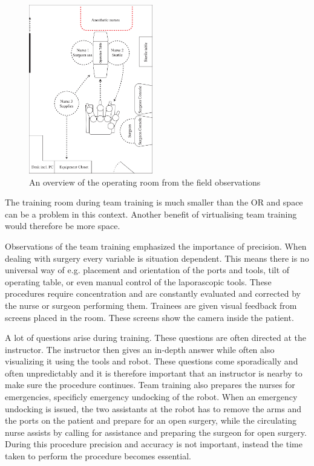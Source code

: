 \documentclass[conference]{IEEEtran}
\begin{document}
\begin{figure}[H]
 \centering
 \includegraphics[width=0.48\textwidth]{Figures/overview.pdf}
 \caption{An overview of the operating room from the field observations}
 \label{fig:overview}
 \end{figure}
 
The training room during team training is much smaller than the OR and space can be a problem in this context. Another benefit of virtualising team training would therefore be more space.

Observations of the team training emphasized the importance of precision. When dealing with surgery every variable is situation dependent. This means there is no universal way of e.g. placement and orientation of the ports and tools, tilt of operating table, or even manual control of the laporascopic tools. These procedures require concentration and are constantly evaluated and corrected by the nurse or surgeon performing them. Trainees are given visual feedback from screens placed in the room. These screens show the camera inside the patient. 


A lot of questions arise during training. These questions are often directed at the instructor. The instructor then gives an in-depth answer while often also visualizing it using the tools and robot. These questions come sporadically and often unpredictably and it is therefore important that an instructor is nearby to make sure the procedure continues. Team training also prepares the nurses for emergencies, specificly emergency undocking of the robot. When an emergency undocking is issued, the two assistants at the robot has to remove the arms and the ports on the patient and prepare for an open surgery, while the circulating nurse assists by calling for assistance and preparing the surgeon for open surgery. During this procedure precision and accuracy is not important, instead the time taken to perform the procedure becomes essential. 
\end{document}
